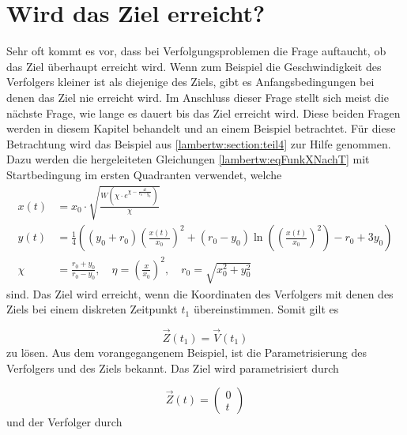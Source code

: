%
%
%
\section{Wird das Ziel erreicht?
\label{lambertw:section:Wird_das_Ziel_erreicht}}

Sehr oft kommt es vor, dass bei Verfolgungsproblemen die Frage auftaucht, ob das Ziel überhaupt erreicht wird.
Wenn zum Beispiel die Geschwindigkeit des Verfolgers kleiner ist als diejenige des Ziels, gibt es Anfangsbedingungen bei denen das Ziel nie erreicht wird.
Im Anschluss dieser Frage stellt sich meist die nächste Frage, wie lange es dauert bis das Ziel erreicht wird.
Diese beiden Fragen werden in diesem Kapitel behandelt und an einem Beispiel betrachtet.
%
Für diese Betrachtung wird das Beispiel aus \eqref{lambertw:section:teil4} zur Hilfe genommen.
Dazu werden die hergeleiteten Gleichungen \eqref{lambertw:eqFunkXNachT} mit Startbedingung im ersten Quadranten verwendet, welche
\begin{align*}
    x\left(t\right)
    &=
    x_0\cdot\sqrt{\frac{W\left(\chi\cdot e^{\chi-\frac{4t}{r_0-y_0}}\right)}{\chi}} \\
    y(t)
    &=
    \frac{1}{4}\left(\left(y_0+r_0\right)\left(\frac{x(t)}{x_0}\right)^2+\left(r_0-y_0\right)\operatorname{ln}\left(\left(\frac{x(t)}{x_0}\right)^2\right)-r_0+3y_0\right)\\
    \chi
    &=
    \frac{r_0+y_0}{r_0-y_0}, \quad
    \eta
    =
    \left(\frac{x}{x_0}\right)^2,\quad
    r_0
    =
    \sqrt{x_0^2+y_0^2}
\end{align*}
%
sind.
Das Ziel wird erreicht, wenn die Koordinaten des Verfolgers mit denen des Ziels bei einem diskreten Zeitpunkt $t_1$ übereinstimmen.
Somit gilt es

\begin{equation*}
    \vec{Z}(t_1)=\vec{V}(t_1)
\end{equation*}
%
zu lösen.
Aus dem vorangegangenem Beispiel, ist die Parametrisierung des Verfolgers und des Ziels bekannt.
Das Ziel wird parametrisiert durch

\begin{equation}
    \vec{Z}(t)
    =
    \left( \begin{array}{c} 0 \\ t \end{array} \right)
\end{equation}
%
und der Verfolger durch

